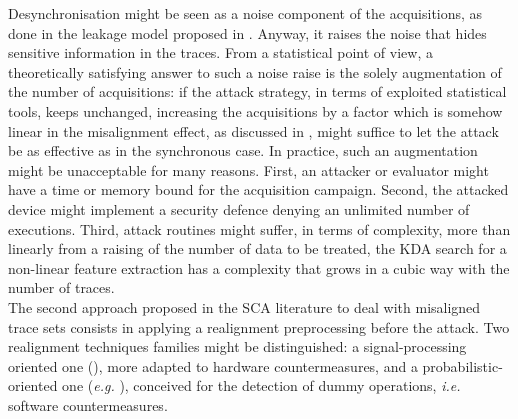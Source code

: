 Desynchronisation might be seen as a noise component of the acquisitions, as done in the leakage model proposed in \cite{chari1999towards}. Anyway, it raises the noise that hides sensitive information in the traces. From a statistical point of view, a theoretically satisfying answer to such a noise raise is the solely augmentation of the number of acquisitions: if the attack strategy, in terms of exploited statistical tools, keeps unchanged, increasing the acquisitions by a factor which is somehow linear in the misalignment effect, as discussed in \cite{mangard2004hardware}, might suffice to let the attack be as effective as in the synchronous case. In practice, such an augmentation might be unacceptable for many reasons. First, an attacker or evaluator might have a time or memory bound for the acquisition campaign. Second, the attacked device might implement a security defence denying an unlimited number of executions. Third, attack routines might suffer, in terms of complexity, more than linearly from a raising of the number of  data to be treated, \eg the KDA search for a non-linear feature extraction has a complexity that grows in a cubic way with the number of traces.  \\

The second approach proposed in the SCA literature to deal with misaligned trace sets consists in applying a realignment preprocessing before the attack. Two realignment techniques families might be distinguished: a signal-processing oriented one (\eg \cite{nagashima2007dpa,van2011improving}), more adapted to hardware countermeasures, and a probabilistic-oriented one (\emph{e.g.} \cite{durvaux2012efficient}), conceived for the detection of dummy operations, \emph{i.e.} software countermeasures. \\

